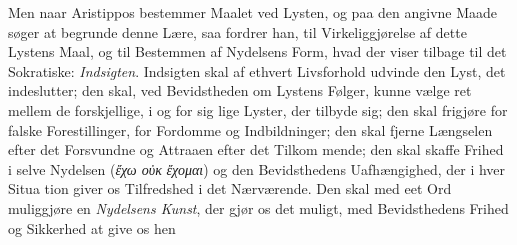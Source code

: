 \documentclass[12pt,a4paper]{book}
\newcommand{\gk}[1]{\textit{#1}}
\begin{document}
Men naar Aristippos bestemmer Maalet ved Lysten, og
paa den angivne Maade søger at begrunde denne Lære, saa
fordrer han, til Virkeliggjørelse af dette Lystens Maal, og til
Bestemmen af Nydelsens Form, hvad der viser tilbage til det
Sokratiske: \emph{Indsigten}. Indsigten skal af ethvert Livsforhold
udvinde den Lyst, det indeslutter; den skal, ved Bevidstheden
om Lystens Følger, kunne vælge ret mellem de forskjellige, i
og for sig lige Lyster, der tilbyde sig; den skal frigjøre for falske
Forestillinger, for Fordomme og Indbildninger; den skal fjerne
Længselen efter det Forsvundne og Attraaen efter det Tilkom\-%
mende; den skal skaffe Frihed i selve Nydelsen (\gk{ἔχω οὐκ}
\gk{ἔχομαι}) og den Bevidsthedens Uafhængighed, der i hver Situa\-%
tion giver os Tilfredshed i det Nærværende. Den skal med
eet Ord muliggjøre en \emph{Nydelsens Kunst}, der gjør os det
muligt, med Bevidsthedens Frihed og Sikkerhed at give os hen
\end{document}
